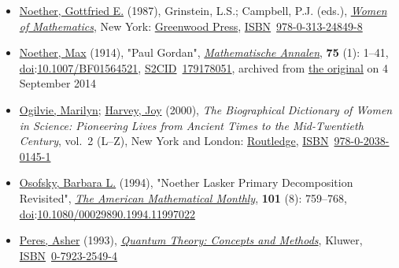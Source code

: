 \begin{itemize}
\item
  \href{https://en.wikipedia.org/wiki/Gottfried_E._Noether}{Noether, Gottfried E.} (1987), Grinstein, L.S.; Campbell, P.J. (eds.), {\href{https://archive.org/details/womenofmathemati0000unse}{\emph{Women of Mathematics}}}, New York: \href{https://en.wikipedia.org/wiki/Greenwood_Press}{Greenwood Press}, \href{https://en.wikipedia.org/wiki/ISBN_(identifier)}{ISBN}{~}\href{https://en.wikipedia.org/wiki/Special:BookSources/978-0-313-24849-8}{978-0-313-24849-8}{}
\item
  \href{https://en.wikipedia.org/wiki/Max_Noether}{Noether, Max} (1914), "Paul Gordan", \emph{\href{https://en.wikipedia.org/wiki/Mathematische_Annalen}{Mathematische Annalen}}, \textbf{75} (1): {1--}41, \href{https://en.wikipedia.org/wiki/Doi_(identifier)}{doi}:\href{https://doi.org/10.1007\%2FBF01564521}{10.1007/BF01564521}, \href{https://en.wikipedia.org/wiki/S2CID_(identifier)}{S2CID}{~}\href{https://api.semanticscholar.org/CorpusID:179178051}{179178051}, archived from \href{http://gdz.sub.uni-goettingen.de/index.php?id=11&PPN=PPN235181684_0075&DMDID=DMDLOG_0007&L=1}{the original} on 4 September 2014{}
\item
  \href{https://en.wikipedia.org/wiki/Marilyn_Bailey_Ogilvie}{Ogilvie, Marilyn}; \href{https://en.wikipedia.org/wiki/Joy_Harvey}{Harvey, Joy} (2000), \emph{The Biographical Dictionary of Women in Science: Pioneering Lives from Ancient Times to the Mid-Twentieth Century}, vol.{~}2 (L--Z), New York and London: \href{https://en.wikipedia.org/wiki/Routledge}{Routledge}, \href{https://en.wikipedia.org/wiki/ISBN_(identifier)}{ISBN}{~}\href{https://en.wikipedia.org/wiki/Special:BookSources/978-0-2038-0145-1}{978-0-2038-0145-1}{}
\item
  \href{https://en.wikipedia.org/wiki/Barbara_L._Osofsky}{Osofsky, Barbara L.} (1994), "Noether Lasker Primary Decomposition Revisited", \emph{\href{https://en.wikipedia.org/wiki/The_American_Mathematical_Monthly}{The American Mathematical Monthly}}, \textbf{101} (8): {759--}768, \href{https://en.wikipedia.org/wiki/Doi_(identifier)}{doi}:\href{https://doi.org/10.1080\%2F00029890.1994.11997022}{10.1080/00029890.1994.11997022}{}
\item
  \href{https://en.wikipedia.org/wiki/Asher_Peres}{Peres, Asher} (1993), \href{https://en.wikipedia.org/wiki/Quantum_Theory:_Concepts_and_Methods}{\emph{Quantum Theory: Concepts and Methods}}, Kluwer, \href{https://en.wikipedia.org/wiki/ISBN_(identifier)}{ISBN}{~}\href{https://en.wikipedia.org/wiki/Special:BookSources/0-7923-2549-4}{0-7923-2549-4}{}

\end{itemize}
